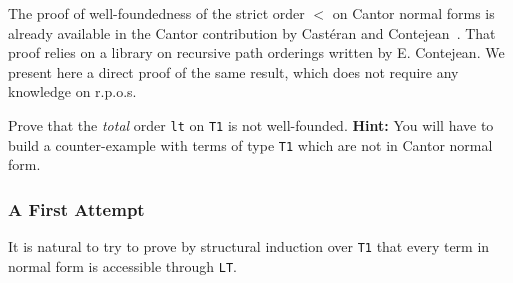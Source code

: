 The proof of well-foundedness of the strict order $<$ on Cantor normal forms is already 
available in the Cantor contribution by Castéran and Contejean~\cite{CantorContrib}. That proof relies on a library on recursive path orderings written by
E. Contejean. We present here  a direct proof of the same result, which does not require any knowledge on r.p.o.s.


\begin{exercise}
Prove that the \emph{total} order \texttt{lt} on \texttt{T1} is not well-founded. 
\textbf{Hint:}  You will have to build a counter-example with terms of type \texttt{T1}
which are not in Cantor normal form.
\end{exercise}



  

 




\subsubsection{A First Attempt}
\label{sec:orgheadline77}

It is natural to try to prove by structural induction over \texttt{T1} 
that every term in normal form is accessible through \texttt{LT}.

